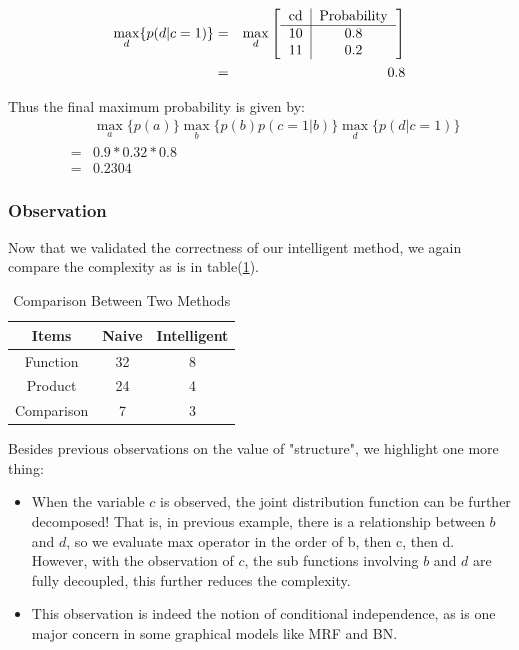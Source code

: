 \documentclass[11pt,a4paper]{article}
\begin{document}
\begin{eqnarray}
\max_{d} \{p(d|c=1) \}  
&=&\max_{d} \left[ 
\begin{tabular}{c|c}
cd & Probability \\
\hline
  10 &   0.8\\
  11 &   0.2\\
\end{tabular} \right] \\
&=& 0.8
\end{eqnarray}

Thus the final maximum probability is given by:
\begin{eqnarray}
	&& \max_{a} \{ p(a) \} \max_{b} \{p(b)p(c=1|b)\} \max_{d} \{p(d|c=1) \} \\
	&=& 0.9 * 0.32 * 0.8 \\
	&=& 0.2304 
\end{eqnarray}

\subsubsection{Observation}

Now that we validated the correctness of our intelligent method, 
we again compare the complexity as is in table(\ref{tbl:toy_cmp2}). 

\begin{table}[htb]
\centering
	\caption{Comparison Between Two Methods}
	\label{tbl:toy_cmp2}
	\begin{tabular}{c|cc}
	\hline
	Items & Naive & Intelligent \\
	\hline
	Function & 32 & 8 \\
	Product & 24 & 4 \\
	Comparison & 7 & 3 \\
	\hline
	\end{tabular}
\end{table}

Besides previous observations on the value of "structure", we 
highlight one more thing:
\begin{itemize}
	\item When the variable $c$ is observed, the joint distribution 
	function can be further decomposed! That is, in previous example, 
	there is a relationship between $b$ and $d$, so we evaluate max operator
	in the order of b, then c, then d. However, with the observation 
	of $c$, the sub functions involving $b$ and $d$ are fully 
	decoupled, this further reduces the complexity. 
	\item This observation is indeed the notion of 
	conditional independence, as is one major concern in 
	some graphical models like MRF and BN. 
\end{itemize}
\end{document}
